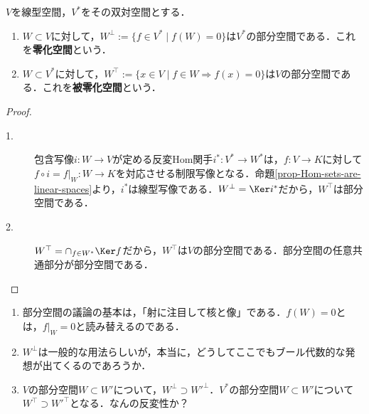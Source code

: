 \documentclass[uplatex, dvipdfmx]{jsreport}
\begin{document}
\begin{proposition}
    $V$を線型空間，$V^*$をその双対空間とする．
    \begin{enumerate}
        \item $W\subset V$に対して，$W^\bot:=\{f\in V^*\mid f(W)=0\}$は$V^*$の部分空間である．これを\textbf{零化空間}という．
        \item $W\subset V^*$に対して，$W^\top:=\{x\in V\mid f\in W\Rightarrow f(x)=0\}$は$V$の部分空間である．これを\textbf{被零化空間}という．
    \end{enumerate}
\end{proposition}
\begin{proof}\mbox{}
    \begin{description}
        \item[1.] 包含写像$i:W\to V$が定める反変Hom関手$i^*:V^*\to W^*$は，$f:V\to K$に対して$f\circ i=f|_W:W\to K$を対応させる制限写像となる．命題\ref{prop-Hom-sets-are-linear-spaces}より，$i^*$は線型写像である．$W^\bot=\Ker i^*$だから，$W^\top$は部分空間である．
        \item[2.] $W^\top=\cap_{f\in W^*}\Ker f$だから，$W^\top$は$V$の部分空間である．部分空間の任意共通部分が部分空間である．
    \end{description}
\end{proof}
\begin{remark}\mbox{}
    \begin{enumerate}
        \item 部分空間の議論の基本は，「射に注目して核と像」である．$f(W)=0$とは，$f|_W=0$と読み替えるのである．
        \item $W^\bot$は一般的な用法らしいが，本当に，どうしてここでもブール代数的な発想が出てくるのであろうか．
        \item $V$の部分空間$W\subset W'$について，$W^\bot\supset W'^\bot$．$V^*$の部分空間$W\subset W'$について$W^\top\supset W'^\top$となる．なんの反変性か？
    \end{enumerate}
\end{remark}
\end{document}
